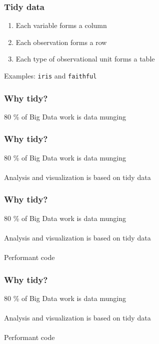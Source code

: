 \documentclass{beamer}
\begin{document}
\begin{frame}
	\frametitle{Tidy data}
	\begin{center}
		\begin{enumerate}
			\item Each variable forms a column
			\item Each observation forms a row
			\item Each type of observational unit forms a table
		\end{enumerate}
		\medskip
		Examples: \texttt{iris} and \texttt{faithful}
	\end{center}
\end{frame}


\begin{frame}
	\frametitle{Why tidy?}
	\begin{center}
		80 \% of Big Data work is data munging\\
	\end{center}
\end{frame}

\begin{frame}
	\frametitle{Why tidy?}
	\begin{center}
		80 \% of Big Data work is data munging\\~\\
		Analysis and visualization is based on tidy data
	\end{center}
\end{frame}

\begin{frame}
	\frametitle{Why tidy?}
	\begin{center}
		80 \% of Big Data work is data munging\\~\\
		Analysis and visualization is based on tidy data\\~\\
		Performant code
	\end{center}
\end{frame}

\begin{frame}
	\frametitle{Why tidy?}
	\begin{center}
		80 \% of Big Data work is data munging\\~\\
		Analysis and visualization is based on tidy data\\~\\
		Performant code \\~\\
	\end{center}
\end{frame}
\end{document}
